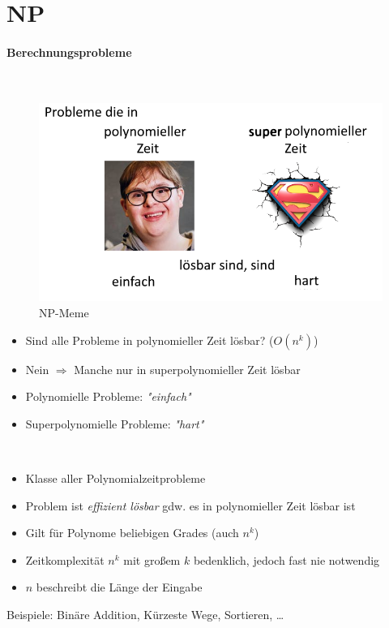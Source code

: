 \documentclass[
    ngerman,
    color=3b,
    dark_mode,
    load_common, %
    summary,
    boxarc,
]{tuda_summary}
\begin{document}
\section{NP}
\paragraph{Berechnungsprobleme}\mbox{}\vspace{-2em}\\
\begin{figure}
      \includegraphics[width=.35\textwidth]{pictures/npmeme.png}
      \caption{NP-Meme}
\end{figure}
\begin{itemize}
      \item Sind alle Probleme in polynomieller Zeit lösbar? ($O(n^k)$)
      \item Nein $\Rightarrow$ Manche nur in superpolynomieller Zeit lösbar
      \item Polynomielle Probleme: \textit{\string"einfach\string"}
      \item Superpolynomielle Probleme: \textit{\string"hart\string"}
\end{itemize}
\mbox{}\vspace{1cm}\\
\begin{definition}[Klasse P]\mbox{}
      \begin{itemize}
            \item Klasse aller Polynomialzeitprobleme
            \item Problem ist \textit{effizient lösbar} gdw. es in polynomieller Zeit lösbar ist
            \item Gilt für Polynome beliebigen Grades (auch $n^k$)
            \item Zeitkomplexität $n^k$ mit gro\ss em $k$ bedenklich, jedoch fast nie notwendig
            \item $n$ beschreibt die Länge der Eingabe
      \end{itemize}
\end{definition}
Beispiele: Binäre Addition, Kürzeste Wege, Sortieren, \dots
\end{document}
